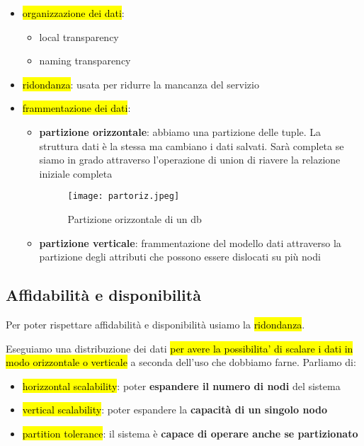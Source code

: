 \begin{itemize}
    \item \hl{organizzazione dei dati}:

        \begin{itemize}
            \item local transparency
            \item naming transparency
        \end{itemize}
    
    \item \hl{ridondanza}: usata per ridurre la mancanza del servizio
    
    \item \hl{frammentazione dei dati}:

        \begin{itemize}
            \item \textbf{partizione orizzontale}: abbiamo una partizione delle tuple. La struttura dati è la stessa ma cambiano i dati salvati. Sarà completa se siamo in grado attraverso l’operazione di union di riavere la relazione iniziale completa
            
            \begin{figure}[H]
            \centering
            \texttt{[image: partoriz.jpeg]}
            \caption{Partizione orizzontale di un db} 
            \label{partoriz}
            \end{figure}

            \item \textbf{partizione verticale}: frammentazione del modello dati attraverso la partizione degli attributi che possono essere dislocati su più nodi
        \end{itemize}
    
\end{itemize}


\subsection{Affidabilità e disponibilità}

Per poter rispettare affidabilità e disponibilità usiamo la \hl{ridondanza}.

Eseguiamo una distribuzione dei dati \hl{per avere la possibilita' di scalare i dati in modo orizzontale o verticale} a seconda dell'uso che dobbiamo farne. Parliamo di:

\begin{itemize}
    \item \hl{horizzontal scalability}: poter \textbf{espandere il numero di nodi} del sistema
    \item \hl{vertical scalability}: poter espandere la \textbf{capacità di un singolo nodo}
    \item \hl{partition tolerance}: il sistema è \textbf{capace di operare anche se partizionato}
\end{itemize}


